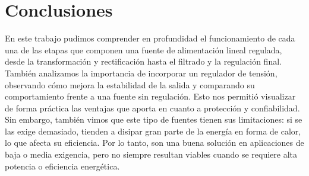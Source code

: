 \documentclass[chaptersright]{informeutn}
\begin{document}
  \chapter{Conclusiones}
    En este trabajo pudimos comprender en profundidad el funcionamiento de cada una de las etapas que componen una fuente
    de alimentación lineal regulada, desde la transformación y rectificación hasta el filtrado y la regulación final.\\ 
   También analizamos la importancia de incorporar un regulador de tensión, observando cómo mejora la estabilidad de la
   salida y comparando su comportamiento frente a una fuente sin regulación. Esto nos permitió visualizar de forma
   práctica las ventajas que aporta en cuanto a protección y confiabilidad.\\ 
   Sin embargo, también vimos que este tipo de fuentes tienen sus limitaciones: si se las exige demasiado, tienden a 
   disipar gran parte de la energía en forma de calor, lo que afecta su eficiencia. Por lo tanto, son una buena solución
   en aplicaciones de baja o media exigencia, pero no siempre resultan viables cuando se requiere alta potencia o eficiencia energética.
    
\end{document}
